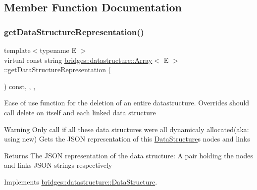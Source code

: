 \subsection{Member Function Documentation}
\mbox{\label{classbridges_1_1datastructure_1_1_array_a210de6729fa08715c13d2deb0b141010}} 
\subsubsection{\texorpdfstring{get\+Data\+Structure\+Representation()}{getDataStructureRepresentation()}}
{\footnotesize\ttfamily template$<$typename E $>$ \\
virtual const string \mbox{\hyperlink{classbridges_1_1datastructure_1_1_array}{bridges\+::datastructure\+::\+Array}}$<$ E $>$\+::get\+Data\+Structure\+Representation (\begin{DoxyParamCaption}{ }\end{DoxyParamCaption}) const\hspace{0.3cm}{\ttfamily [inline]}, {\ttfamily [final]}, {\ttfamily [override]}, {\ttfamily [virtual]}}

Ease of use function for the deletion of an entire datastructure. Overrides should call delete on itself and each linked data structure

\begin{DoxyWarning}{Warning}
Only call if all these data structures were all dynamicaly allocated(aka\+: using new) Gets the J\+S\+ON representation of this \mbox{\hyperlink{classbridges_1_1datastructure_1_1_data_structure}{Data\+Structure}}\textquotesingle{}s nodes and links
\end{DoxyWarning}
\begin{DoxyReturn}{Returns}
The J\+S\+ON representation of the data structure\+: A pair holding the nodes and links J\+S\+ON strings respectively 
\end{DoxyReturn}


Implements \mbox{\hyperlink{classbridges_1_1datastructure_1_1_data_structure}{bridges\+::datastructure\+::\+Data\+Structure}}.

\mbox{\label{classbridges_1_1datastructure_1_1_array_aa2a14939c8e53087e833ebf71822a057}} 
